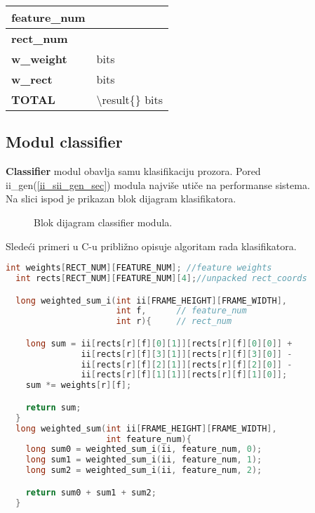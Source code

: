 \begin{center}
  \centering
    \begin{tabular}{| P{3.0cm} | P{3.0cm}|}
    \hline
     \textbf{feature\_num} & \featureNum{}  \\ \hline
     \textbf{rect\_num} & \rectNum{}  \\ \hline
     \textbf{w\_weight} & \wWeight{} bits  \\ \hline
     \textbf{w\_rect} & \wRect{} bits  \\ \hline
       \textbf{TOTAL} &  \num[group-separator={,}]{\result{}} bits \\ \hline
    \end{tabular}
     \label{feature_mem_size}
\end{center}

\newpage

\subsection{Modul classifier}

\textbf{Classifier} modul obavlja samu klasifikaciju prozora.
Pored ii\_gen(\ref{ii_sii_gen_sec}) modula najviše utiče na performanse sistema. \\

Na slici ispod je prikazan blok dijagram klasifikatora.\\

\begin{figure}[H]
  \centering
  \resizebox{0.9\textwidth}{!}{%
    
    }
\caption{Blok dijagram classifier modula.}
\label{classifier_bd}
\end{figure}

\newpage

Sledeći primeri u C-u približno opisuje algoritam rada klasifikatora.

\begin{lstlisting}[language=C++,caption={Weighted\_sum u \textbf{C}-u},captionpos=b, label=weighted_sum_code]
  int weights[RECT_NUM][FEATURE_NUM]; //feature weights
  int rects[RECT_NUM][FEATURE_NUM][4];//unpacked rect_coords

  long weighted_sum_i(int ii[FRAME_HEIGHT][FRAME_WIDTH],
                      int f,      // feature_num
                      int r){     // rect_num

    long sum = ii[rects[r][f][0][1]][rects[r][f][0][0]] +
               ii[rects[r][f][3][1]][rects[r][f][3][0]] -
               ii[rects[r][f][2][1]][rects[r][f][2][0]] -
               ii[rects[r][f][1][1]][rects[r][f][1][0]];
    sum *= weights[r][f];

    return sum;
  }
  long weighted_sum(int ii[FRAME_HEIGHT][FRAME_WIDTH],
                    int feature_num){
    long sum0 = weighted_sum_i(ii, feature_num, 0);
    long sum1 = weighted_sum_i(ii, feature_num, 1);
    long sum2 = weighted_sum_i(ii, feature_num, 2);

    return sum0 + sum1 + sum2;
  }
\end{lstlisting}


